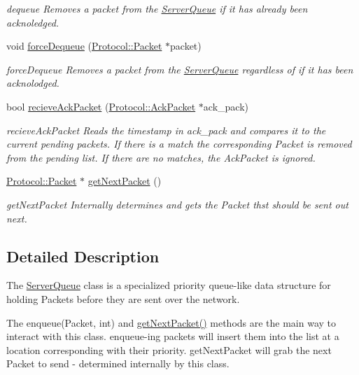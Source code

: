 \begin{DoxyCompactItemize}
\begin{DoxyCompactList}\small\item\em dequeue Removes a packet from the \hyperlink{class_server_queue}{Server\+Queue} if it has already been acknoledged. \end{DoxyCompactList}\item 
void \hyperlink{class_server_queue_a8d0d64b34a8e2a342009b496bfe8b196}{force\+Dequeue} (\hyperlink{class_protocol_1_1_packet}{Protocol\+::\+Packet} $\ast$packet)
\begin{DoxyCompactList}\small\item\em force\+Dequeue Removes a packet from the \hyperlink{class_server_queue}{Server\+Queue} regardless of if it has been acknolodged. \end{DoxyCompactList}\item 
bool \hyperlink{class_server_queue_a4815b1a73a46c6b581bd70a82b04d1b0}{recieve\+Ack\+Packet} (\hyperlink{class_protocol_1_1_ack_packet}{Protocol\+::\+Ack\+Packet} $\ast$ack\+\_\+pack)
\begin{DoxyCompactList}\small\item\em recieve\+Ack\+Packet Reads the timestamp in ack\+\_\+pack and compares it to the current pending packets. If there is a match the corresponding Packet is removed from the pending list. If there are no matches, the Ack\+Packet is ignored. \end{DoxyCompactList}\item 
\hyperlink{class_protocol_1_1_packet}{Protocol\+::\+Packet} $\ast$ \hyperlink{class_server_queue_a89278291c92e8ec01d730407d3f2f806}{get\+Next\+Packet} ()
\begin{DoxyCompactList}\small\item\em get\+Next\+Packet Internally determines and gets the Packet thst should be sent out next. \end{DoxyCompactList}\end{DoxyCompactItemize}


\subsection{Detailed Description}
The \hyperlink{class_server_queue}{Server\+Queue} class is a specialized priority queue-\/like data structure for holding Packets before they are sent over the network. 

The enqueue(\+Packet, int) and \hyperlink{class_server_queue_a89278291c92e8ec01d730407d3f2f806}{get\+Next\+Packet()} methods are the main way to interact with this class. enqueue-\/ing packets will insert them into the list at a location corresponding with their priority. get\+Next\+Packet will grab the next Packet to send -\/ determined internally by this class.

